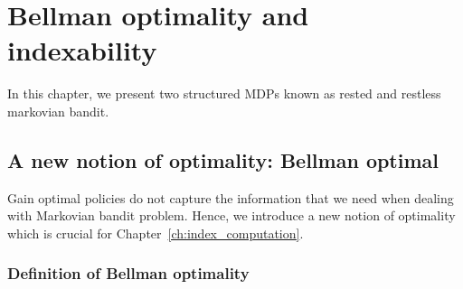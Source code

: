 \begingroup

\let\clearpage\relax

\chapter{Bellman optimality and indexability}
\label{ch:indexability}

In this chapter, we present two structured MDPs known as rested and restless markovian bandit.

\section{A new notion of optimality: Bellman optimal}
\label{ch:mbp:sec:bell}

Gain optimal policies do not capture the information that we need when dealing with Markovian bandit problem.
Hence, we introduce a new notion of optimality which is crucial for Chapter~\ref{ch:index_computation}.

\subsection{Definition of Bellman optimality}

